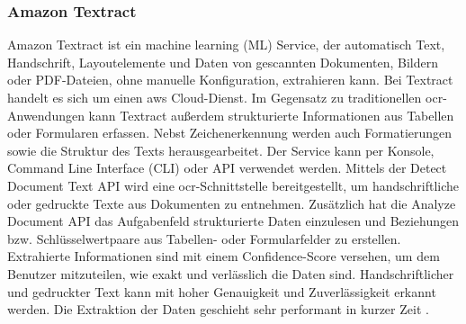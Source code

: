 \subsubsection{Amazon Textract}
Amazon Textract ist ein machine learning (ML) Service, der automatisch Text, Handschrift, Layoutelemente und Daten von gescannten Dokumenten, Bildern oder PDF-Dateien, ohne manuelle Konfiguration, extrahieren kann. Bei Textract handelt es sich um einen \gls{aws} Cloud-Dienst. Im Gegensatz zu traditionellen \gls{ocr}-Anwendungen kann Textract außerdem strukturierte Informationen aus Tabellen oder Formularen erfassen. Nebst Zeichenerkennung werden auch Formatierungen sowie die Struktur des Texts herausgearbeitet. Der Service kann per Konsole, Command Line Interface (CLI) oder API verwendet werden. Mittels der Detect Document Text API wird eine \gls{ocr}-Schnittstelle bereitgestellt, um handschriftliche oder gedruckte Texte aus Dokumenten zu entnehmen. Zusätzlich hat die Analyze Document API das Aufgabenfeld strukturierte Daten einzulesen und Beziehungen bzw. Schlüsselwertpaare aus Tabellen- oder Formularfelder zu erstellen. Extrahierte Informationen sind mit einem Confidence-Score versehen, um dem Benutzer mitzuteilen, wie exakt und verlässlich die Daten sind. Handschriftlicher und gedruckter Text kann mit hoher Genauigkeit und Zuverlässigkeit erkannt werden. Die Extraktion der Daten geschieht sehr performant in kurzer Zeit \cite{textract}.

